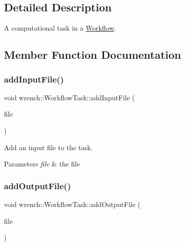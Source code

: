 \subsection{Detailed Description}
A computational task in a \hyperlink{classwrench_1_1_workflow}{Workflow}. 

\subsection{Member Function Documentation}
\mbox{\label{classwrench_1_1_workflow_task_a3498047afb74ea6ce2132d44f8c678e8}} 
\subsubsection{\texorpdfstring{add\+Input\+File()}{addInputFile()}}
{\footnotesize\ttfamily void wrench\+::\+Workflow\+Task\+::add\+Input\+File (\begin{DoxyParamCaption}\item[{\hyperlink{classwrench_1_1_workflow_file}{Workflow\+File} $\ast$}]{file }\end{DoxyParamCaption})}



Add an input file to the task. 


\begin{DoxyParams}{Parameters}
{\em file} & the file \\
\hline
\end{DoxyParams}
\mbox{\label{classwrench_1_1_workflow_task_ac774b4fddc07753f5fc7daa31ae28fd3}} 
\subsubsection{\texorpdfstring{add\+Output\+File()}{addOutputFile()}}
{\footnotesize\ttfamily void wrench\+::\+Workflow\+Task\+::add\+Output\+File (\begin{DoxyParamCaption}\item[{\hyperlink{classwrench_1_1_workflow_file}{Workflow\+File} $\ast$}]{file }\end{DoxyParamCaption})}



